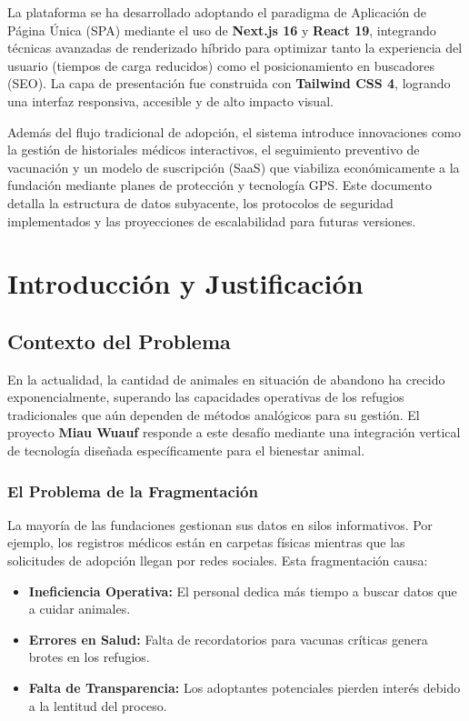 \documentclass[12pt,a4paper,oneside]{report}
\begin{document}
La plataforma se ha desarrollado adoptando el paradigma de Aplicación de Página Única (SPA) mediante el uso de \textbf{Next.js 16} y \textbf{React 19}, integrando técnicas avanzadas de renderizado híbrido para optimizar tanto la experiencia del usuario (tiempos de carga reducidos) como el posicionamiento en buscadores (SEO). La capa de presentación fue construida con \textbf{Tailwind CSS 4}, logrando una interfaz responsiva, accesible y de alto impacto visual.

Además del flujo tradicional de adopción, el sistema introduce innovaciones como la gestión de historiales médicos interactivos, el seguimiento preventivo de vacunación y un modelo de suscripción (SaaS) que viabiliza económicamente a la fundación mediante planes de protección y tecnología GPS. Este documento detalla la estructura de datos subyacente, los protocolos de seguridad implementados y las proyecciones de escalabilidad para futuras versiones.

\clearpage
\clearpage
\tableofcontents
{}
\listoffigures
{}
\listoftables
\clearpage
\clearpage


\chapter{Introducción y Justificación}

\section{Contexto del Problema}
En la actualidad, la cantidad de animales en situación de abandono ha crecido exponencialmente, superando las capacidades operativas de los refugios tradicionales que aún dependen de métodos analógicos para su gestión. El proyecto \textbf{Miau Wuauf} responde a este desafío mediante una integración vertical de tecnología diseñada específicamente para el bienestar animal.

\subsection{El Problema de la Fragmentación}
La mayoría de las fundaciones gestionan sus datos en silos informativos. Por ejemplo, los registros médicos están en carpetas físicas mientras que las solicitudes de adopción llegan por redes sociales. Esta fragmentación causa:
\begin{itemize}
    \item \textbf{Ineficiencia Operativa:} El personal dedica más tiempo a buscar datos que a cuidar animales.
    \item \textbf{Errores en Salud:} Falta de recordatorios para vacunas críticas genera brotes en los refugios.
    \item \textbf{Falta de Transparencia:} Los adoptantes potenciales pierden interés debido a la lentitud del proceso.
\end{itemize}
\end{document}
